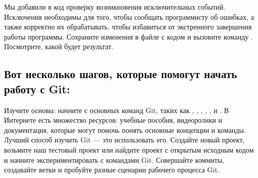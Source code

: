 \documentclass[letterpaper,10pt,russian]{sphinxmanual}
\begin{document}
\sphinxAtStartPar
Мы добавили в код проверку возникновения исключительных событий. Исключения необходимы для того, чтобы сообщать программисту об ошибках, а также корректно их обрабатывать, чтобы избавиться от экстренного завершения работы программы. Сохраните изменения в файле с кодом и вызовите команду . Посмотрите, какой будет результат.


\subsection{Вот несколько шагов, которые помогут начать работу с Git:}
\label{\detokenize{educational_materials/git_base/content:id9}}
\sphinxAtStartPar
Изучите основы: начните с основных команд Git, таких как , , , , ,  и . В Интернете есть множество ресурсов: учебные пособия, видеоролики и документация, которые могут помочь понять основные концепции и команды.
Лучший способ изучить Git — это использовать его. Создайте новый проект, возьмите наш тестовый проект или найдите проект с открытым исходным кодом и начните экспериментировать с командами Git. Совершайте коммиты, создавайте ветки и пробуйте разные сценарии рабочего процесса Git.
\end{document}
